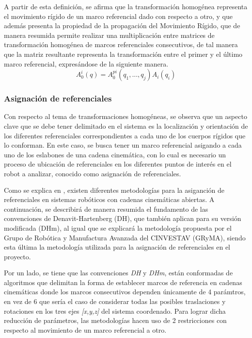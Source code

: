         A partir de esta definición, se afirma que la transformación homogénea representa
        el movimiento rígido de un marco referencial dado con respecto a otro, y que además 
        presenta la propiedad de la propagación del Movimiento Rígido, que de manera resumida 
        permite realizar una multiplicación entre matrices de transformación homogénea de 
        marcos referenciales consecutivos, de tal manera que la matriz resultante representa 
        la transformación entre el primer y el último marco referencial, expresándose de la 
        siguiente manera.
        \begin{equation}
            A^i_0(q) =  A^{pi}_0(q_1,...,q_j)A_i(q_i)
            \label{eq:CD}
        \end{equation}

    \subsubsection{Asignación de referenciales}
        \noindent Con respecto al tema de transformaciones homogéneas, se observa que un 
        aspecto clave que se debe tener delimitado en el sistema es la localización 
        y orientación de los diferentes referenciales correspondientes a cada uno de 
        los cuerpos rígidos que lo conforman. En este caso, se busca tener un marco 
        referencial asigando a cada uno de los eslabones de una cadena cinemática, con lo cual es 
        necesario un proceso de ubicación de referenciales en los diferentes 
        puntos de interés en el robot a analizar, conocido como asignación de referenciales.

        Como se explica en \cite{3DMotion}, existen diferentes metodologías para la asiganción 
        de referenciales en sistemas robóticos con cadenas cinemáticas abiertas. A 
        continuación, se describirá de manera resumida el fundamento de las convenciones de 
        Denavit-Hartenberg (DH), que también aplican para su versión modificada (DHm), 
        al igual que se explicará la metodología propuesta por el Grupo de Robótica y 
        Manufactura Avanzada del CINVESTAV (GRyMA), siendo esta última la metodología 
        utilizada para la asignación de referenciales en el proyecto.

        Por un lado, se tiene que las convenciones \emph{DH} y \emph{DHm}, están conformadas 
        de algoritmos que delimitan la forma de establecer marcos de referencia en 
        cadenas cinemáticas donde los marcos consecutivos dependen únicamente de 4 parámtros, 
        en vez de 6 que sería el caso de considerar todas las posibles traslaciones y rotaciones 
        en los tres ejes \emph{[x,y,z]} del sistema coordenado. Para lograr dicha reducción de 
        parámetros, las metodologías hacen uso de 2 restricciones con respecto al movimiento de 
        un marco referencial a otro.

